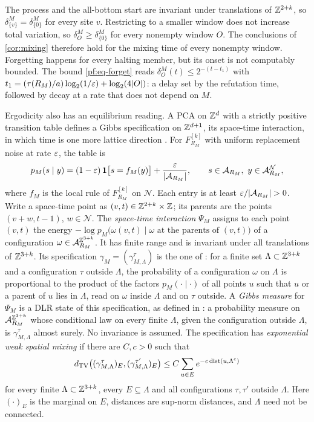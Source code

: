The process and the all-bottom start are invariant under translations of $\mathbb{Z}^{2+k}$, so $\delta^M_{\{v\}}=\delta^M_{\{0\}}$ for every site $v$. Restricting to a smaller window does not increase total variation, so $\delta^M_O\ge\delta^M_{\{0\}}$ for every nonempty window $O$. The conclusions of \cref{cor:mixing} therefore hold for the mixing time of every nonempty window. Forgetting happens for every halting member, but its onset is not computably bounded. The bound \eqref{pf:eq-forget} reads $\delta^M_O(t)\le2^{-(t-t_1)}$ with $t_1=(\tau(R_M)/a)\log_2(1/\varepsilon)+\log_2(4|O|)$: a delay set by the refutation time, followed by decay at a rate that does not depend on $M$.

Ergodicity also has an equilibrium reading. A PCA on $\mathbb{Z}^d$ with a strictly positive transition table defines a Gibbs specification on $\mathbb{Z}^{d+1}$, its space-time interaction, in which time is one more lattice direction \cite{GKLM89,LMS90,DM26}. For $F^{[k]}_{R_M}$ with uniform replacement noise at rate $\varepsilon$, the table is
\[
p_M(s\mid y)=(1-\eps)\,\mathbf 1\bigl[s=f_M(y)\bigr]+\frac{\eps}{|\A_{R_M}|},\qquad s\in\A_{R_M},\ y\in\A_{R_M}^{\mathcal N},
\]
where $f_M$ is the local rule of $F^{[k]}_{R_M}$ on $\mathcal N$. Each entry is at least $\eps/|\A_{R_M}|>0$. Write a space-time point as $(v,t)\in\mathbb{Z}^{2+k}\times\mathbb{Z}$; its parents are the points $(v+w,t-1)$, $w\in\mathcal N$. The \emph{space-time interaction} $\Psi_M$ assigns to each point $(v,t)$ the energy $-\log p_M\bigl(\omega(v,t)\mid\omega\text{ at the parents of }(v,t)\bigr)$ of a configuration $\omega\in\mathcal{A}_{R_M}^{\mathbb{Z}^{3+k}}$. It has finite range and is invariant under all translations of $\mathbb{Z}^{3+k}$. Its specification $\gamma_M=(\gamma^\tau_{M,\Lambda})$ is the one of \cite[eq.~(6)]{DM26}: for a finite set $\Lambda\subset\mathbb{Z}^{3+k}$ and a configuration $\tau$ outside $\Lambda$, the probability of a configuration $\omega$ on $\Lambda$ is proportional to the product of the factors $p_M(\cdot\mid\cdot)$ of all points $u$ such that $u$ or a parent of $u$ lies in $\Lambda$, read on $\omega$ inside $\Lambda$ and on $\tau$ outside. A \emph{Gibbs measure} for $\Psi_M$ is a DLR state of this specification, as defined in \cite[Section~2]{DM26}: a probability measure on $\mathcal{A}_{R_M}^{\mathbb{Z}^{3+k}}$ whose conditional law on every finite $\Lambda$, given the configuration outside $\Lambda$, is $\gamma^{\tau}_{M,\Lambda}$ almost surely. No invariance is assumed. The specification has \emph{exponential weak spatial mixing} \cite[Definition~2.3]{DM26} if there are $C,c>0$ such that
\begin{equation}\label{pf:eq-wsm}
d_{\mathrm{TV}}\bigl((\gamma^\tau_{M,\Lambda})_E,(\gamma^{\tau'}_{M,\Lambda})_E\bigr)\le C\sum_{u\in E}e^{-c\,\mathrm{dist}(u,\Lambda^c)}
\end{equation}
for every finite $\Lambda\subset\mathbb{Z}^{3+k}$, every $E\subseteq\Lambda$ and all configurations $\tau,\tau'$ outside $\Lambda$. Here $(\cdot)_E$ is the marginal on $E$, distances are sup-norm distances, and $\Lambda$ need not be connected.

